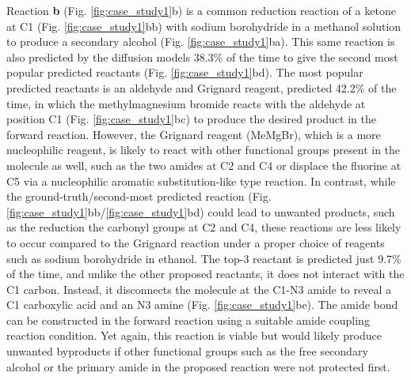 \documentclass{article}
\begin{document}
Reaction \textbf{b} (Fig. \ref{fig:case_study1}b) is a common reduction reaction of a ketone at C1 (Fig. \ref{fig:case_study1}bb) with sodium borohydride in a methanol solution to produce a secondary alcohol (Fig. \ref{fig:case_study1}ba). This same reaction is also predicted by the diffusion models 38.3\% of the time to give the second most popular predicted reactants (Fig. \ref{fig:case_study1}bd). The most popular predicted reactants  is an aldehyde and  Grignard reagent, predicted 42.2\% of the time, in which the methylmagnesium bromide reacts with the aldehyde at position C1 (Fig. \ref{fig:case_study1}bc) to produce the desired product in the forward reaction. However, the Grignard reagent (MeMgBr), which is a more nucleophilic reagent, is likely to react with other functional groups present in the molecule as well, such as the two amides at C2 and C4 or displace the fluorine at C5 via a nucleophilic aromatic substitution-like type reaction. In contrast, while the ground-truth/second-most predicted reaction (Fig. \ref{fig:case_study1}bb/\ref{fig:case_study1}bd) could lead to unwanted products, such as the reduction the carbonyl groups at C2 and C4, these reactions are less likely to occur compared to the Grignard reaction under a proper choice of reagents such as sodium borohydride in ethanol. The top-3 reactant is predicted just 9.7\% of the time, and unlike the other proposed reactants, it does not interact with the C1 carbon. Instead, it disconnects the molecule at the C1-N3 amide to reveal a C1 carboxylic acid and an N3 amine (Fig. \ref{fig:case_study1}be). The amide bond can be constructed in the forward reaction using a suitable amide coupling reaction condition. Yet again, this reaction is viable but would likely produce unwanted byproducts if other functional groups such as the free secondary alcohol or the primary amide in the proposed reaction were not protected first.
\end{document}
